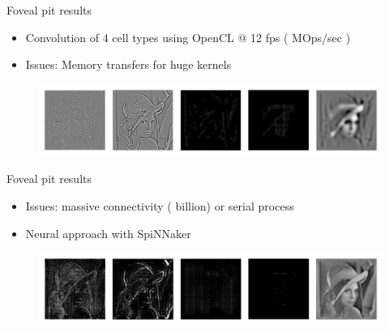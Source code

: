 \documentclass[17pt,mathserif]{beamer}
\begin{document}
    \begin{frame}{Foveal pit results}
      \vspace*{-4em}
      \begin{itemize}
        \item Convolution of 4 cell types using OpenCL @ 12 fps ( MOps/sec )
        \item Issues: Memory transfers for huge kernels
      \end{itemize}
      \vspace*{-1em}
      \begin{figure}
        \includegraphics[width=\textwidth]{conv-imgs}
      \end{figure}
    \end{frame}
    \begin{frame}{Foveal pit results}
      \vspace*{-3em}
      \begin{itemize}
        \item Issues: massive connectivity ( billion) or serial process
        \item Neural approach with SpiNNaker
      \end{itemize}
      \vspace*{-1em}
      \begin{figure}
        \includegraphics[width=\textwidth]{focal-imgs}
      \end{figure}
    \end{frame}
\end{document}
